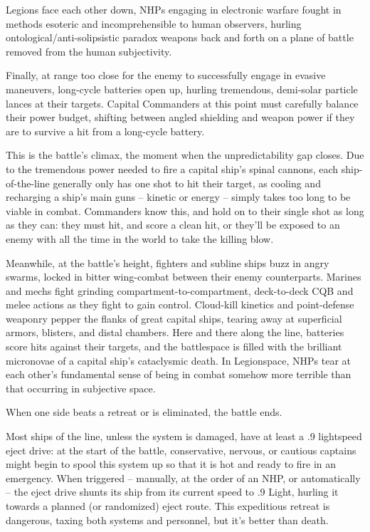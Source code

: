 Legions face each other down, NHPs engaging in electronic warfare fought in methods esoteric  
and incomprehensible to human observers, hurling ontological/anti-solipsistic paradox weapons  
back and forth on a plane of battle removed from the human subjectivity. 
 

Finally, at range too close for the enemy to successfully engage in evasive maneuvers, long-cycle  
batteries open up, hurling tremendous, demi-solar particle lances at their targets. Capital  
Commanders at this point must carefully balance their power budget, shifting between angled  
shielding and weapon power if they are to survive a hit from a long-cycle battery. 
 

This is the battle’s climax, the moment when the unpredictability gap closes. Due to the  
tremendous power needed to fire a capital ship’s spinal cannons, each ship-of-the-line generally  
only has one shot to hit their target, as cooling and recharging a ship’s main guns -- kinetic or  
energy -- simply takes too long to be viable in combat. Commanders know this, and hold on to  
their single shot as long as they can: they must hit, and score a clean hit, or they’ll be exposed to  
an enemy with all the time in the world to take the killing blow. 
 

Meanwhile, at the battle’s height, fighters and subline ships buzz in angry swarms, locked in  
bitter wing-combat between their enemy counterparts. Marines and mechs fight grinding  
compartment-to-compartment, deck-to-deck CQB and melee actions as they fight to gain  
control. Cloud-kill kinetics and point-defense weaponry pepper the flanks of great capital ships,  
tearing away at superficial armors, blisters, and distal chambers. Here and there along the line,  
batteries score hits against their targets, and the battlespace is filled with the brilliant micronovae  
of a capital ship’s cataclysmic death. In Legionspace, NHPs tear at each other’s fundamental  
sense of being in combat somehow more terrible than that occurring in subjective space.  
 

When one side beats a retreat or is eliminated, the battle ends. 
 

                                                                                                           


Most ships of the line, unless the system is damaged, have at least a .9 lightspeed eject drive: at  
the start of the battle, conservative, nervous, or cautious captains might begin to spool this  
system up so that it is hot and ready to fire in an emergency. When triggered -- manually, at the  
order of an NHP, or automatically -- the eject drive shunts its ship from its current speed to .9  
Light, hurling it towards a planned (or randomized) eject route. This expeditious retreat is  
dangerous, taxing both systems and personnel, but it’s better than death. 
 

